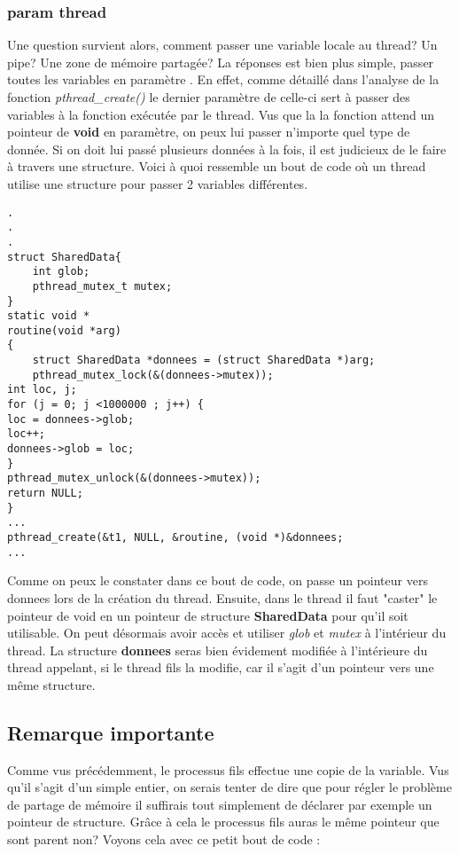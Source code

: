 \subsubsection{param thread}
Une question survient alors, comment passer une variable locale au thread? Un pipe? Une zone de mémoire partagée? La réponses est bien plus simple, passer toutes les variables en paramètre . En effet, comme détaillé dans l'analyse de la fonction \textit{pthread\_create()} le dernier paramètre de celle-ci sert à passer des variables à la fonction exécutée par le thread. Vus que la la fonction attend un pointeur de \textbf{void} en paramètre, on peux lui passer n'importe quel type de donnée. Si on doit lui passé plusieurs données à la fois, il est judicieux de le faire à travers une structure. Voici à quoi ressemble un bout de code où un thread utilise une structure pour passer 2 variables différentes.
\\

\begin{lstlisting}[title = Variable en paramètre]
.
.
.
struct SharedData{
    int glob;
    pthread_mutex_t mutex;
}
static void *
routine(void *arg)
{
    struct SharedData *donnees = (struct SharedData *)arg;
    pthread_mutex_lock(&(donnees->mutex));
int loc, j;
for (j = 0; j <1000000 ; j++) {
loc = donnees->glob;
loc++;
donnees->glob = loc;
}
pthread_mutex_unlock(&(donnees->mutex));
return NULL;
}
...
pthread_create(&t1, NULL, &routine, (void *)&donnees;
...
\end{lstlisting}
\vspace{\baselineskip}


Comme on peux le constater dans ce bout de code, on passe un pointeur vers donnees lors de la création du thread. Ensuite, dans le thread il faut "caster" le pointeur de void en un pointeur de structure \textbf{SharedData} pour qu'il soit utilisable. On peut désormais avoir accès et utiliser \textit{glob} et \textit{mutex} à l'intérieur du thread. La structure \textbf{donnees} seras bien évidement modifiée à l'intérieure du thread appelant, si le thread fils la modifie, car il s'agit d'un pointeur vers une même structure.


\subsection{Remarque importante}

Comme vus précédemment, le processus fils effectue une copie de la variable. Vus qu'il s'agit d'un simple entier, on serais tenter de dire que pour régler le problème de partage de mémoire il suffirais tout simplement de déclarer par exemple un pointeur de structure. Grâce à cela le processus fils auras le même pointeur que sont parent non? Voyons cela avec ce petit bout de code : 

